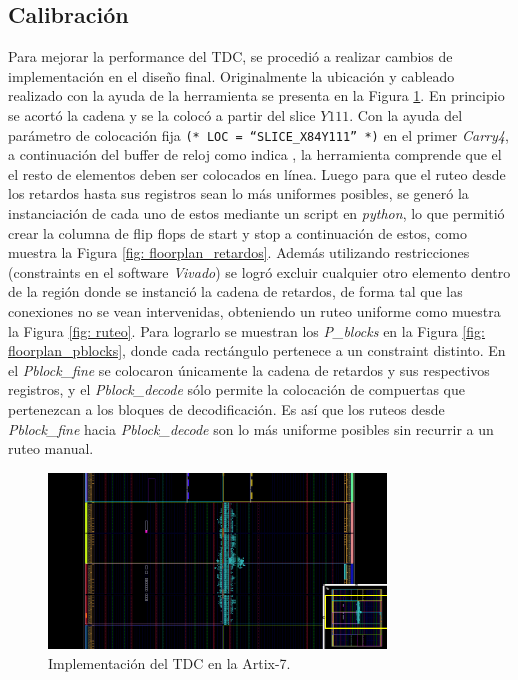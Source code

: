  \subsection{Calibración}
 Para mejorar la performance del TDC, se procedió a realizar cambios de implementación en el diseño final. Originalmente 
 la ubicación y cableado realizado con la ayuda de la herramienta se presenta en la Figura \ref{fig: floorplan_0}. 
 En principio se acortó la cadena y se la colocó a partir del slice $Y111$. Con la ayuda del
 parámetro de colocación fija \texttt{(* LOC = ``SLICE\_X84Y111'' *)} en el primer \textit{Carry4}, a continuación del buffer 
 de reloj como indica \cite{machado_novel_2018}, la herramienta comprende que el el resto de elementos deben ser colocados en línea. 
 Luego para que el ruteo desde 
 los retardos hasta sus registros sean lo más uniformes posibles, se generó la instanciación de cada uno de estos mediante un script en
 \textit{python}, lo que permitió crear la columna de flip flops de start y stop a continuación de estos, como muestra la Figura \ref{fig: floorplan_retardos}.
 Además utilizando restricciones (constraints en el software \textit{Vivado}) se logró excluir cualquier otro elemento dentro de la región donde se instanció la cadena de retardos,
 de forma tal que las conexiones no se vean intervenidas, obteniendo un ruteo uniforme como muestra la Figura \ref{fig: ruteo}. 
 Para lograrlo se muestran los \textit{P\_blocks} en la Figura \ref{fig: floorplan_pblocks}, donde cada
 rectángulo pertenece a un constraint distinto. En el \textit{Pblock\_fine} se colocaron
 únicamente la cadena de retardos y sus respectivos registros, y el \textit{Pblock\_decode} sólo permite la colocación de compuertas que 
 pertenezcan a los bloques de decodificación. Es así que los ruteos desde \textit{Pblock\_fine} hacia \textit{Pblock\_decode} son lo más
 uniforme posibles sin recurrir a un ruteo manual.

 \begin{figure}[H]
      \centering
      \includegraphics[width=0.8\textwidth]{imagenes/floorplan_0.png}
      \caption{Implementación del TDC en la Artix-7.}
      \label{fig: floorplan_0}
 \end{figure}

